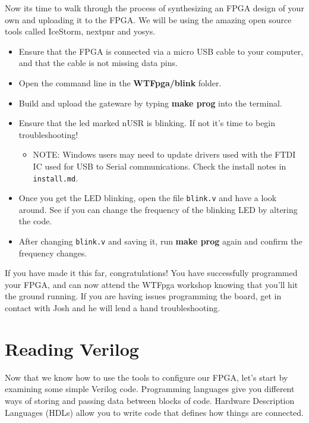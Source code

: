 \documentclass[12pt,a4paper]{article}
\begin{document}
\noindent
Now its time to walk through the process of synthesizing an FPGA design of your own and uploading it to the FPGA. We will be using the amazing open source tools called IceStorm, nextpnr and yosys. 
\begin{itemize}
		\item Ensure that the FPGA is connected via a micro USB cable to your computer, and that the cable is not missing data pins.
		\item Open the command line in the \textbf{WTFpga/blink} folder.
		\item Build and upload the gateware by typing \textbf{make prog} into the terminal. 
		\item Ensure that the led marked nUSR is blinking. If not it's time to begin troubleshooting!
			\begin{itemize}
				\item NOTE: Windows users may need to update drivers used with the FTDI IC used for USB to Serial communications. Check the install notes in \texttt{install.md}.
			\end{itemize}
		\item Once you get the LED blinking, open the file \texttt{blink.v} and have a look around. See if you can change the frequency of the blinking LED by altering the code. 
		\item After changing \texttt{blink.v} and saving it, run \textbf{make prog} again and confirm the frequency changes. 
\end{itemize}
If you have made it this far, congratulations! You have successfully programmed your FPGA, and can now attend the WTFpga workshop knowing that you'll hit the ground running. If you are having issues programming the board, get in contact with Josh and he will lend a hand troubleshooting. 
\newpage
\section{Reading Verilog}
Now that we know how to use the tools to configure our FPGA, let’s start by examining some simple Verilog code. Programming languages give you different ways of storing and passing data between blocks of code. Hardware Description Languages (HDLs) allow you to write code that defines how things are connected. 
\end{document}
